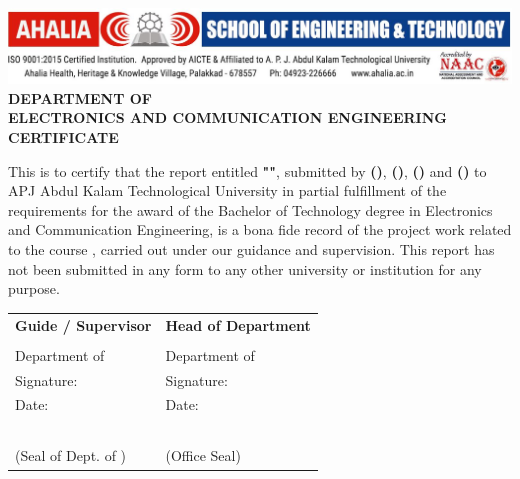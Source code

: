 \newpage
\thispagestyle{empty}

\begin{center}
	\includegraphics[scale=0.38]{images/logo/ASETlogo.jpg}\\
	
	\vspace{0.2in}
	\fontsize{14}{16} 
	\textbf{DEPARTMENT OF\\ ELECTRONICS AND COMMUNICATION ENGINEERING}\\
	
	\vspace{0.3in}
	\fontsize{16}{18} 
	\textbf{CERTIFICATE}\\
\end{center}

\vspace{0.1in}


\fontsize{12}{14} 

This is to certify that the report entitled \textbf{\MakeUppercase{"\projname"}}, submitted by \textbf{\MakeUppercase{\grpmema}}  \textbf{(\memnuma)}, \textbf{\MakeUppercase{\grpmemb}} \textbf{(\memnumb)}, \textbf{\MakeUppercase{\grpmemc}} \textbf{(\memnumc)} and \textbf{\MakeUppercase{\grpmemd}} \textbf{(\memnumd)} to APJ Abdul Kalam Technological University in partial fulfillment of the requirements for the award of the Bachelor of Technology degree in Electronics and Communication Engineering, is a bona fide record of the project work related to the course \textbf{\subj}, carried out under our guidance and supervision. This report has not been submitted in any form to any other university or institution for any purpose.

\begin{flushleft}
	\begin{tabular}{p{} p{}}
		\textbf{Guide / Supervisor}  							& \textbf{Head of Department}\\
		\projguideSentCase			 							& \hodSentCase \\
		Department of \dept										& Department of \dept \\
		Signature: 												& Signature: \\
		Date:													& Date: \\
																& \\
																& \\
																& \\
																& \\
																& \\
		(Seal of Dept. of \dept)								& (Office Seal)\\
	\end{tabular}
\end{flushleft}